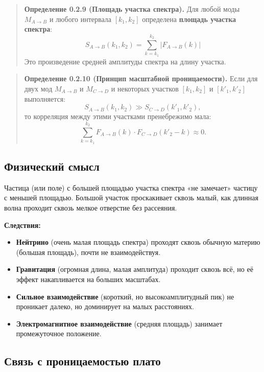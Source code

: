 \documentclass[12pt,a4paper]{article}
\begin{document}
\begin{quote}
\textbf{Определение 0.2.9 (Площадь участка спектра).} Для любой моды $M_{A \to B}$ и любого интервала $[k_1, k_2]$ определена \textbf{площадь участка спектра}:
\begin{equation}
    S_{A \to B}(k_1, k_2) = \sum_{k=k_1}^{k_2} |F_{A \to B}(k)|
\end{equation}
Это произведение средней амплитуды спектра на длину участка.
\end{quote}

\begin{quote}
\textbf{Определение 0.2.10 (Принцип масштабной проницаемости).} Если для двух мод $M_{A \to B}$ и $M_{C \to D}$ и некоторых участков $[k_1, k_2]$ и $[k'_1, k'_2]$ выполняется:
\begin{equation}
    S_{A \to B}(k_1, k_2) \gg S_{C \to D}(k'_1, k'_2),
\end{equation}
то корреляция между этими участками пренебрежимо мала:
\begin{equation}
    \sum_{k=k_1}^{k_2} F_{A \to B}(k) \cdot F_{C \to D}(k'_2 - k) \approx 0.
\end{equation}
\end{quote}

\subsection{Физический смысл}

Частица (или поле) с большей площадью участка спектра «не замечает» частицу с меньшей площадью. Большой участок проскакивает сквозь малый, как длинная волна проходит сквозь мелкое отверстие без рассеяния.

\textbf{Следствия:}
\begin{itemize}
    \item \textbf{Нейтрино} (очень малая площадь спектра) проходят сквозь обычную материю (большая площадь), почти не взаимодействуя.
    \item \textbf{Гравитация} (огромная длина, малая амплитуда) проходит сквозь всё, но её эффект накапливается на больших масштабах.
    \item \textbf{Сильное взаимодействие} (короткий, но высокоамплитудный пик) не проникает далеко, но доминирует на малых расстояниях.
    \item \textbf{Электромагнитное взаимодействие} (средняя площадь) занимает промежуточное положение.
\end{itemize}

\subsection{Связь с проницаемостью плато}
\end{document}
